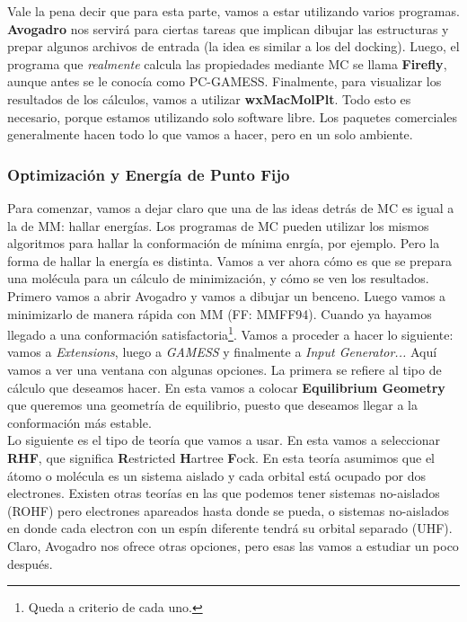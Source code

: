 \documentclass[10pt,letterpaper]{article}
\begin{document}
Vale la pena decir que para esta parte, vamos a estar utilizando varios programas. \textbf{Avogadro} nos servir\'a para ciertas tareas que implican dibujar las estructuras y prepar algunos archivos de entrada (la idea es similar a los del docking). Luego, el programa que \emph{realmente} calcula las propiedades mediante MC se llama \textbf{Firefly}, aunque antes se le conoc\'ia como PC-GAMESS. Finalmente, para visualizar los resultados de los c\'alculos, vamos a utilizar \textbf{wxMacMolPlt}. Todo esto es necesario, porque estamos utilizando solo software libre. Los paquetes comerciales generalmente hacen todo lo que vamos a hacer, pero en un solo ambiente.

\subsubsection{Optimizaci\'on y Energ\'ia de Punto Fijo}
Para comenzar, vamos a dejar claro que una de las ideas detr\'as de MC es igual a la de MM: hallar energ\'ias. Los programas de MC pueden utilizar los mismos algoritmos para hallar la conformaci\'on de m\'inima enrg\'ia, por ejemplo. Pero la forma de hallar la energ\'ia es distinta. Vamos a ver ahora c\'omo es que se prepara una mol\'ecula para un c\'alculo de minimizaci\'on, y c\'omo se ven los resultados.\\

Primero vamos a abrir Avogadro y vamos a dibujar un benceno. Luego vamos a minimizarlo de manera r\'apida con MM (FF: MMFF94). Cuando ya hayamos llegado a una conformaci\'on satisfactoria\footnote{Queda a criterio de cada uno.}. Vamos a proceder a hacer lo siguiente: vamos a \emph{Extensions}, luego a \emph{GAMESS} y finalmente a \emph{Input Generator...} Aqu\'i vamos a ver una ventana con algunas opciones. La primera se refiere al tipo de c\'alculo que deseamos hacer. En esta vamos a colocar \textbf{Equilibrium Geometry} que queremos una geometr\'ia de equilibrio, puesto que deseamos llegar a la conformaci\'on m\'as estable.\\

Lo siguiente es el tipo de teor\'ia que vamos a usar. En esta vamos a seleccionar \textbf{RHF}, que significa \textbf{R}estricted \textbf{H}artree \textbf{F}ock. En esta teor\'ia asumimos que el \'atomo o mol\'ecula es un sistema aislado y cada orbital est\'a ocupado por dos electrones. Existen otras teor\'ias en las que podemos tener sistemas no-aislados (ROHF) pero electrones apareados hasta donde se pueda, o sistemas no-aislados en donde cada electron con un esp\'in diferente tendr\'a su orbital separado (UHF). Claro, Avogadro nos ofrece otras opciones, pero esas las vamos a estudiar un poco despu\'es.\\
\end{document}
